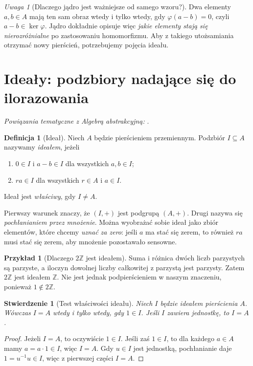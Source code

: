 \documentclass[11pt,a4paper,openany]{report}
\numberwithin{equation}{section}
\theoremstyle{plain}
\newtheorem{stwierdzenie}[twierdzenie]{Stwierdzenie}
\theoremstyle{definition}
\newtheorem{definicja}[twierdzenie]{Definicja}
\newtheorem{przyklad}[twierdzenie]{Przykład}
\theoremstyle{remark}
\newtheorem{uwaga}[twierdzenie]{Uwaga}
\newcommand{\Z}{\mathbb Z}
\newcommand{\kerf}{\operatorname{ker}}
\begin{document}
\begin{uwaga}[Dlaczego jądro jest ważniejsze od samego wzoru?]
Dwa elementy $a,b\in A$ mają ten sam obraz wtedy i tylko wtedy, gdy
$\varphi(a-b)=0$, czyli $a-b\in\kerf\varphi$.
Jądro dokładnie opisuje więc \emph{jakie elementy stają się
nierozróżnialne} po zastosowaniu homomorfizmu. Aby z takiego
utożsamiania otrzymać nowy pierścień, potrzebujemy pojęcia ideału.
\end{uwaga}

\section{Ideały: podzbiory nadające się do ilorazowania}

\noindent\emph{Powiązania tematyczne z Algebrą abstrakcyjną:} .


\begin{definicja}[Ideał]
Niech $A$ będzie pierścieniem przemiennym. Podzbiór $I\subseteq A$
nazywamy \emph{ideałem}, jeżeli
\begin{enumerate}[label=(I\arabic*)]
\item $0\in I$ i $a-b\in I$ dla wszystkich $a,b\in I$;
\item $ra\in I$ dla wszystkich $r\in A$ i $a\in I$.
\end{enumerate}
Ideał jest \emph{właściwy}, gdy $I\ne A$.
\end{definicja}

Pierwszy warunek znaczy, że $(I,+)$ jest podgrupą $(A,+)$.
Drugi nazywa się \emph{pochłanianiem przez mnożenie}.
Można wyobrażać sobie ideał jako zbiór elementów, które chcemy
\emph{uznać za zero}: jeśli $a$ ma stać się zerem, to również
$ra$ musi stać się zerem, aby mnożenie pozostawało sensowne.

\begin{przyklad}[Dlaczego $2\Z$ jest ideałem]
Suma i różnica dwóch liczb parzystych są parzyste,
a iloczyn dowolnej liczby całkowitej z parzystą jest parzysty.
Zatem $2\Z$ jest ideałem $\Z$. Nie jest jednak podpierścieniem
w naszym znaczeniu, ponieważ $1\notin2\Z$.
\end{przyklad}

\begin{stwierdzenie}[Test właściwości ideału]
Niech $I$ będzie ideałem pierścienia $A$. Wówczas
$I=A$ wtedy i tylko wtedy, gdy $1\in I$.
Jeśli $I$ zawiera jednostkę, to $I=A$.
\end{stwierdzenie}
\begin{proof}
Jeżeli $I=A$, to oczywiście $1\in I$. Jeśli zaś $1\in I$,
to dla każdego $a\in A$ mamy $a=a\cdot1\in I$, więc $I=A$.
Gdy $u\in I$ jest jednostką, pochłanianie daje
$1=u^{-1}u\in I$, więc z pierwszej części $I=A$.
\end{proof}
\end{document}
